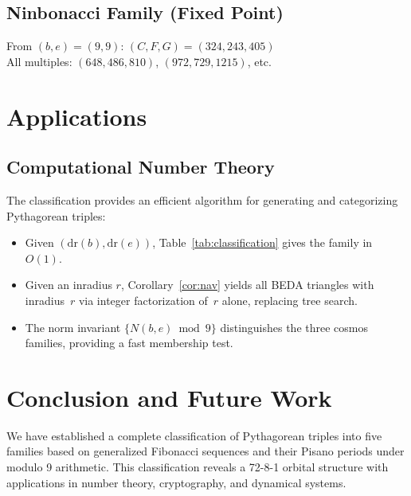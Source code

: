 \documentclass[12pt]{article}
\begin{document}
\subsection{Ninbonacci Family (Fixed Point)}
From $(b, e) = (9, 9)$: $(C, F, G) = (324, 243, 405)$\\
All multiples: $(648, 486, 810)$, $(972, 729, 1215)$, etc.

\section{Applications}

\subsection{Computational Number Theory}

The classification provides an efficient algorithm for generating and categorizing Pythagorean triples:
\begin{itemize}
\item Given $(\mathrm{dr}(b),\mathrm{dr}(e))$, Table~\ref{tab:classification} gives the family in $O(1)$.
\item Given an inradius $r$, Corollary~\ref{cor:nav} yields all BEDA triangles with inradius~$r$ via integer factorization of~$r$ alone, replacing tree search.
\item The norm invariant $\{N(b,e)\bmod9\}$ distinguishes the three cosmos families, providing a fast membership test.
\end{itemize}

\section{Conclusion and Future Work}

We have established a complete classification of Pythagorean triples into five families based on generalized Fibonacci sequences and their Pisano periods under modulo 9 arithmetic. This classification reveals a 72-8-1 orbital structure with applications in number theory, cryptography, and dynamical systems.
\end{document}
